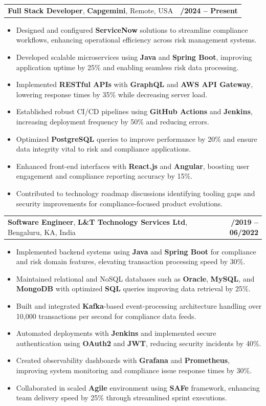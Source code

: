 \documentclass[letterpaper,11pt]{article}
\makeatletter
\newcommand{\resumeItem}[1]{
  \item\footnotesize{
    {#1 \vspace{-2pt}}
  }
}
\newcommand{\resumeSubheading}[4]{
  \vspace{-2pt}\item
    \begin{tabular*}{1.0\textwidth}[t]{l@{\extracolsep{\fill}}r}
      \textbf{\fontsize{10pt}{14pt}\selectfont #3}, \textbf{\fontsize{10pt}{14pt}\selectfont #1}, \fontsize{10pt}{14pt}\selectfont #4 & \textbf{\fontsize{10pt}{14pt}\selectfont #2} \\
    \end{tabular*}\vspace{-7pt}
}
\newcommand{\resumeItemListStart}{\begin{itemize}[leftmargin=*]}
\newcommand{\resumeItemListEnd}{\end{itemize}\vspace{-5pt}}
\makeatother
\begin{document}
    \resumeSubheading
        {Capgemini}{01/2024 -- Present}
        {Full Stack Developer}{Remote, USA}
      \resumeItemListStart
        \resumeItem{Designed and configured \textbf{ServiceNow} solutions to streamline compliance workflows, enhancing operational efficiency across risk management systems.}
        \resumeItem{Developed scalable microservices using \textbf{Java} and \textbf{Spring Boot}, improving application uptime by 25\% and enabling seamless risk data processing.}
        \resumeItem{Implemented \textbf{RESTful APIs} with \textbf{GraphQL} and \textbf{AWS API Gateway}, lowering response times by 35\% while decreasing server load.}
        \resumeItem{Established robust CI/CD pipelines using \textbf{GitHub Actions} and \textbf{Jenkins}, increasing deployment frequency by 50\% and reducing errors.}
        \resumeItem{Optimized \textbf{PostgreSQL} queries to improve performance by 20\% and ensure data integrity vital to risk and compliance applications.}
        \resumeItem{Enhanced front-end interfaces with \textbf{React.js} and \textbf{Angular}, boosting user engagement and compliance reporting accuracy by 15\%.}
        \resumeItem{Contributed to technology roadmap discussions identifying tooling gaps and security improvements for compliance-focused product evolutions.}
      \resumeItemListEnd

    \resumeSubheading
        {L\&T Technology Services Ltd}{08/2019 -- 06/2022}
        {Software Engineer}{Bengaluru, KA, India}
      \resumeItemListStart
        \resumeItem{Implemented backend systems using \textbf{Java} and \textbf{Spring Boot} for compliance and risk domain features, elevating transaction processing speed by 30\%.}
        \resumeItem{Maintained relational and NoSQL databases such as \textbf{Oracle}, \textbf{MySQL}, and \textbf{MongoDB} with optimized \textbf{SQL} queries improving data retrieval by 25\%.}
        \resumeItem{Built and integrated \textbf{Kafka}-based event-processing architecture handling over 10,000 transactions per second for compliance data feeds.}
        \resumeItem{Automated deployments with \textbf{Jenkins} and implemented secure authentication using \textbf{OAuth2} and \textbf{JWT}, reducing security incidents by 40\%.}
        \resumeItem{Created observability dashboards with \textbf{Grafana} and \textbf{Prometheus}, improving system monitoring and compliance issue response times by 30\%.}
        \resumeItem{Collaborated in scaled \textbf{Agile} environment using \textbf{SAFe} framework, enhancing team delivery speed by 25\% through streamlined sprint executions.}
      \resumeItemListEnd
\end{document}
